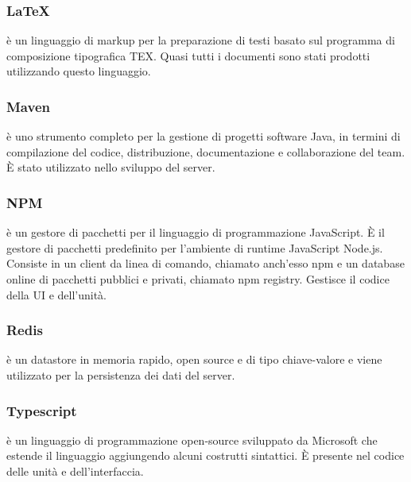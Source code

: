 	\subsubsection{LaTeX}
	 è un linguaggio di markup per la preparazione di testi basato sul programma di composizione tipografica TEX. Quasi tutti i documenti sono stati prodotti utilizzando questo linguaggio.
	
	\subsubsection{Maven}
	 è uno strumento completo per la gestione di progetti software Java, in termini di compilazione del codice, distribuzione, documentazione e collaborazione del team. È stato utilizzato nello sviluppo del server.
	
	\subsubsection{NPM}
	 è un gestore di pacchetti per il linguaggio di programmazione JavaScript. È il gestore	di pacchetti predefinito per l’ambiente di runtime JavaScript Node.js. Consiste in un client da linea di comando, chiamato anch’esso npm e un database online di pacchetti pubblici e privati, chiamato npm registry. Gestisce il codice della UI e dell'unità.
	
	\subsubsection{Redis}
	 è un datastore in memoria rapido, open source e di tipo chiave-valore e viene utilizzato per la persistenza dei dati del server.

	\subsubsection{Typescript}
	 è un linguaggio di programmazione open-source sviluppato da Microsoft che estende il linguaggio  aggiungendo alcuni costrutti sintattici. È presente nel codice delle unità e dell'interfaccia.

